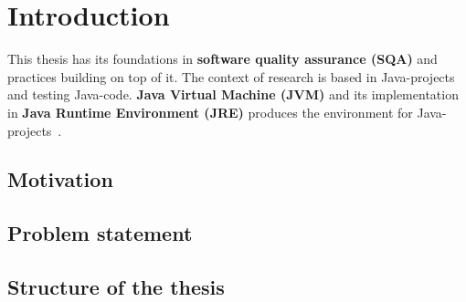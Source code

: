 \chapter{Introduction}
\label{chapter:intro}

This thesis has its foundations in \textbf{software quality assurance (SQA)} and practices building on top of it. The context of research
is based in Java-projects and testing Java-code. \textbf{Java Virtual Machine (JVM)} and its implementation in \textbf{Java Runtime Environment (JRE)}
produces the environment for Java-projects~\cite{wiki:jvm}.

\section{Motivation}
\section{Problem statement}
\section{Structure of the thesis}

